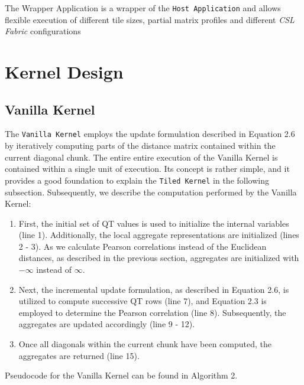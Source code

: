 The Wrapper Application is a wrapper of the \texttt{Host Application} and allows flexible execution of different tile sizes, partial matrix profiles and different \textit{CSL Fabric} configurations

\section{Kernel Design}

\subsection{Vanilla Kernel}

The \texttt{Vanilla Kernel} employs the update formulation described in Equation 2.6 by iteratively computing parts of the distance matrix contained within the current diagonal chunk. The entire entire execution of the Vanilla Kernel is contained within a single unit of execution. Its concept is rather simple, and it provides a good foundation to explain the \texttt{Tiled Kernel} in the following subsection. Subsequently, we describe the computation performed by the Vanilla Kernel:

\begin{enumerate}
    \item First, the initial set of QT values is used to initialize the internal variables (line 1). Additionally, the local aggregate representations are initialized (lines 2 - 3). As we calculate Pearson correlations instead of the Euclidean distances, as described in the previous section, aggregates are initialized with $-\infty$ instead of $\infty$.
    \item Next, the incremental update formulation, as described in Equation 2.6, is utilized to compute successive QT rows (line 7), and Equation 2.3 is employed to determine the Pearson correlation (line 8). Subsequently, the aggregates are updated accordingly (line 9 - 12).
    \item Once all diagonals within the current chunk have been computed, the aggregates are returned (line 15).
\end{enumerate}

Pseudocode for the Vanilla Kernel can be found in Algorithm 2.

